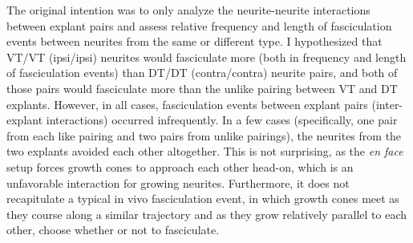 The original intention was to only analyze the neurite-neurite interactions between explant pairs and assess relative frequency and length of fasciculation events between neurites from the same or different type.
I hypothesized that VT/VT (ipsi/ipsi) neurites would fasciculate more (both in frequency and length of fasciculation events) than DT/DT (contra/contra) neurite pairs, and both of those pairs would fasciculate more than the unlike pairing between VT and DT explants.
However, in all cases, fasciculation events between explant pairs (inter-explant interactions) occurred infrequently.
In a few cases (specifically, one pair from each like pairing and two pairs from unlike pairings), the neurites from the two explants avoided each other altogether.
This is not surprising, as the \emph{en face} setup forces growth cones to approach each other head-on, which is an unfavorable interaction for growing neurites. 
Furthermore, it does not recapitulate a typical in vivo fasciculation event, in which growth cones meet as they course along a similar trajectory and as they grow relatively parallel to each other, choose whether or not to fasciculate.


